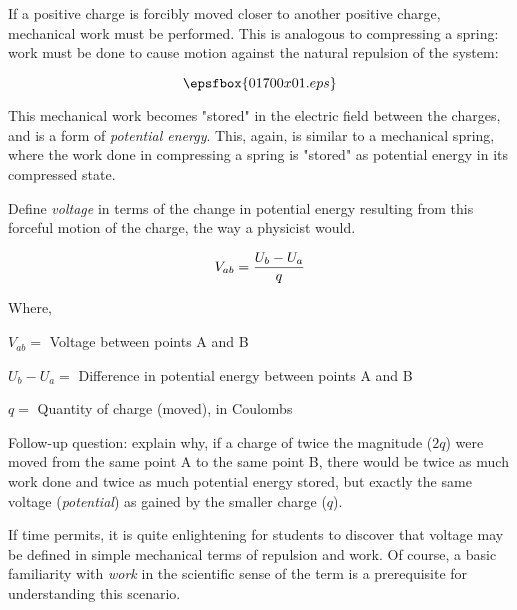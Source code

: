 

If a positive charge is forcibly moved closer to another positive charge, mechanical work must be performed.  This is analogous to compressing a spring: work must be done to cause motion against the natural repulsion of the system:

$$\epsfbox{01700x01.eps}$$

This mechanical work becomes "stored" in the electric field between the charges, and is a form of {\it potential energy}.  This, again, is similar to a mechanical spring, where the work done in compressing a spring is "stored" as potential energy in its compressed state.  

Define {\it voltage} in terms of the change in potential energy resulting from this forceful motion of the charge, the way a physicist would.







$$V_{ab} = {{U_b - U_a} \over q}$$

\noindent
Where,

$V_{ab} = $ Voltage between points A and B

$U_b - U_a = $ Difference in potential energy between points A and B 

$q = $ Quantity of charge (moved), in Coulombs

\vskip 10pt

Follow-up question: explain why, if a charge of twice the magnitude ($2q$) were moved from the same point A to the same point B, there would be twice as much work done and twice as much potential energy stored, but exactly the same voltage ({\it potential}) as gained by the smaller charge ($q$).







If time permits, it is quite enlightening for students to discover that voltage may be defined in simple mechanical terms of repulsion and work.  Of course, a basic familiarity with {\it work} in the scientific sense of the term is a prerequisite for understanding this scenario.





